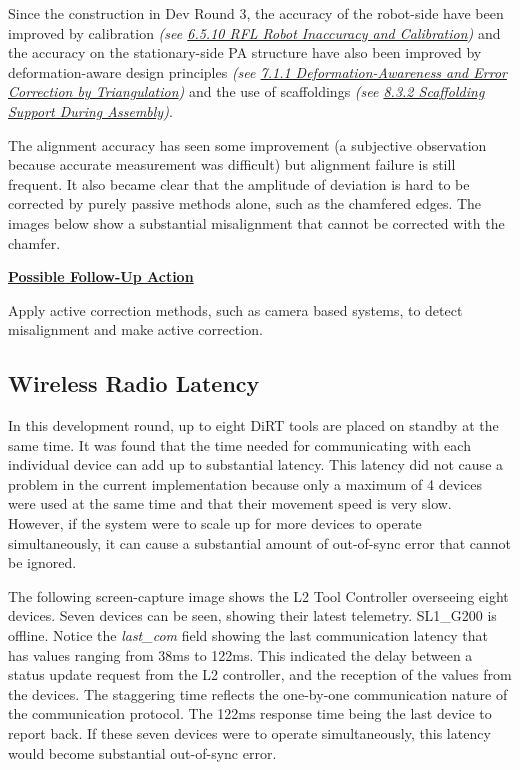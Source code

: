 Since the construction in Dev Round 3, the accuracy of the robot-side have been improved by calibration \textit{(see \ul{6.5.10 RFL Robot Inaccuracy and Calibration})} and the accuracy on the stationary-side PA structure have also been improved by deformation-aware design principles \textit{(see \ul{7.1.1 Deformation-Awareness and Error Correction by Triangulation})} and the use of scaffoldings \textit{(see \ul{8.3.2 Scaffolding Support During Assembly})}.

The alignment accuracy has seen some improvement (a subjective observation because accurate measurement was difficult) but alignment failure is still frequent. It also became clear that the amplitude of deviation is hard to be corrected by purely passive methods alone, such as the chamfered edges. The images below show a substantial misalignment that cannot be corrected with the chamfer. 




\textbf{\ul{Possible Follow-Up Action}}

Apply active correction methods, such as camera based systems, to detect misalignment and make active correction.

\subsection{Wireless Radio Latency}

In this development round, up to eight DiRT tools are placed on standby at the same time. It was found that the time needed for communicating with each individual device can add up to substantial latency. This latency did not cause a problem in the current implementation because only a maximum of 4 devices were used at the same time and that their movement speed is very slow. However, if the system were to scale up for more devices to operate simultaneously, it can cause a substantial amount of out-of-sync error that cannot be ignored.

The following screen-capture image shows the L2 Tool Controller overseeing eight devices. Seven devices can be seen, showing their latest telemetry. SL1\_G200 is offline. Notice the \textit{last\_com }field showing the last communication latency that has values ranging from 38ms to 122ms. This indicated the delay between a status update request from the L2 controller, and the reception of the values from the devices. The staggering time reflects the one-by-one communication nature of the communication protocol. The 122ms response time being the last device to report back. If these seven devices were to operate simultaneously, this latency would become substantial out-of-sync error. 

